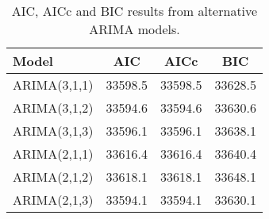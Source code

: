\begin{table}[ht]
\centering
\caption[AIC, AICc and BIC results from alternative ARIMA models]{AIC, AICc and BIC results from alternative ARIMA models.} 
\label{tab:chp_ts:arima_res_r}
\begin{tabular}{lccc}
  \toprule Model & AIC & AICc & BIC \\ 
  \midrule ARIMA(3,1,1) & 33598.5 & 33598.5 & 33628.5 \\ 
  ARIMA(3,1,2) & 33594.6 & 33594.6 & 33630.6 \\ 
  ARIMA(3,1,3) & 33596.1 & 33596.1 & 33638.1 \\ 
  ARIMA(2,1,1) & 33616.4 & 33616.4 & 33640.4 \\ 
  ARIMA(2,1,2) & 33618.1 & 33618.1 & 33648.1 \\ 
  ARIMA(2,1,3) & 33594.1 & 33594.1 & 33630.1 \\ 
   \bottomrule \end{tabular}
\end{table}
